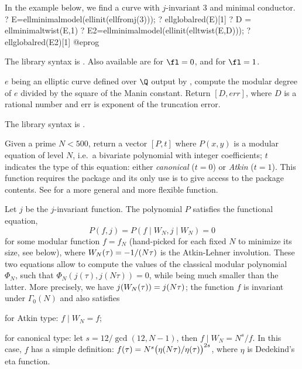 In the example below, we find a curve with $j$-invariant $3$ and minimal
conductor.
\bprog
? E=ellminimalmodel(ellinit(ellfromj(3)));
? ellglobalred(E)[1]
? D = ellminimaltwist(E,1)
? E2=ellminimalmodel(ellinit(elltwist(E,D)));
? ellglobalred(E2)[1]
@eprog

The library syntax is .
Also available are
 for $\fl=0$, and
 for $\fl=1$.

\label{se:ellmoddegree}
$e$ being an elliptic curve defined over $\Q$ output by ,
 compute the modular degree of $e$ divided by the square of
 the Manin constant. Return $[D, err]$, where $D$ is a rational number and
 err is exponent of the truncation error.

The library syntax is .

\label{se:ellmodulareqn}
Given a prime $N < 500$, return a vector $[P,t]$ where $P(x,y)$
is a modular equation of level $N$, i.e.~a bivariate polynomial with integer
coefficients; $t$ indicates the type of this equation: either
\emph{canonical} ($t = 0$) or \emph{Atkin} ($t = 1$). This function requires
the  package and its only use is to give access to the package
contents. See  for a more general and more flexible function.

Let $j$ be the $j$-invariant function. The polynomial $P$ satisfies
the functional equation,
$$ P(f,j) = P(f \mid W_N, j \mid W_N) = 0 $$
for some modular function $f = f_N$ (hand-picked for each fixed $N$ to
minimize its size, see below), where $W_N(\tau) = -1 / (N\*\tau)$ is the
Atkin-Lehner involution. These two equations allow to compute the values of
the classical modular polynomial $\Phi_N$, such that $\Phi_N(j(\tau),
j(N\tau)) = 0$, while being much smaller than the latter. More precisely, we
have $j(W_N(\tau)) = j(N\*\tau)$; the function $f$ is invariant under
$\Gamma_0(N)$ and also satisfies

\item for Atkin type: $f \mid W_N = f$;

\item for canonical type: let $s = 12/\gcd(12,N-1)$, then
$f \mid W_N = N^s / f$. In this case, $f$ has a simple definition:
$f(\tau) = N^s \* \big(\eta(N\*\tau) / \eta(\tau) \big)^{2\*s}$,
where $\eta$ is Dedekind's eta function.

